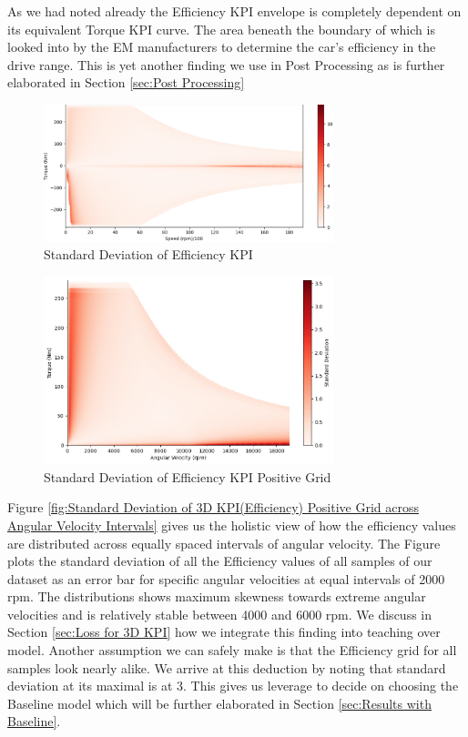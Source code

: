 \documentclass{report} %
\begin{document}
As we had noted already the Efficiency \ac{KPI} envelope is completely dependent on its equivalent Torque \ac{KPI} curve. 
The area beneath the boundary of which is looked into by the \ac{EM} manufacturers to determine the car's efficiency in the drive range.
This is yet another finding we use in Post Processing as is further elaborated in Section \ref{sec:Post Processing}

\begin{figure}[H]
    \centering
    \includegraphics[width=0.75\textwidth]{./ReportImages/stddev_y2.png} 
    \caption{Standard Deviation of Efficiency \ac{KPI}} 
    \label{fig:Standard Deviation of 3D KPI(Efficiency)}
\end{figure}

\begin{figure}[H]
    \centering
    \includegraphics[width=0.75\textwidth]{./ReportImages/pos_stddev_y2.png} 
    \caption{Standard Deviation of Efficiency \ac{KPI} Positive Grid} 
    \label{fig:Standard Deviation of 3D KPI(Efficiency) Positive Grid}
\end{figure}

Figure \ref{fig:Standard Deviation of 3D KPI(Efficiency) Positive Grid across Angular Velocity Intervals} gives us the holistic view of how the efficiency values are 
distributed across equally spaced intervals of angular velocity. The Figure plots the standard deviation of all the Efficiency values of all samples of our dataset 
as an error bar for specific angular velocities at equal intervals of 2000 rpm.
The distributions shows maximum skewness towards extreme angular velocities and is relatively stable between 4000 and 6000 rpm. 
We discuss in Section \ref{sec:Loss for 3D KPI} how we integrate this finding into teaching over model.
Another assumption we can safely make is that the Efficiency grid for all samples look nearly alike. We arrive at this deduction by noting that standard deviation at its 
maximal is at 3. This gives us leverage to decide on choosing the Baseline model which will be further elaborated in Section \ref{sec:Results with Baseline}.
\end{document}
